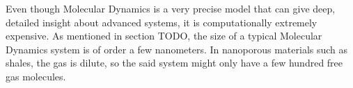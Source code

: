 Even though Molecular Dynamics is a very precise model that can give deep, detailed insight about advanced systems, it is computationally extremely expensive. As mentioned in section TODO, the size of a typical Molecular Dynamics system is of order a few nanometers. In nanoporous materials such as shales, the gas is dilute, so the said system might only have a few hundred free gas molecules. 